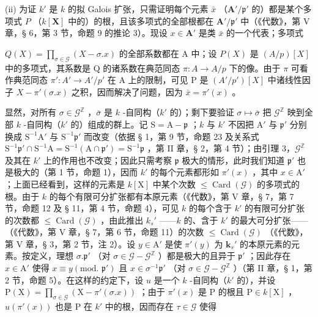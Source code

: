 (ii) 为证 \(k'\) 是 \(k\) 的拟 Galois 扩张，只需证明每个元素 \(\bar{x}\) （\(\mathbf{A}'/\mathfrak{p}'\) 的）都是某个多项式 \(P\) （\(k[\mathbf{X}]\) 中的）的根，且该多项式的全部根都在 \(\mathbf{A}'/\mathfrak{p}'\) 中（《代数》，第 V 章，§ 6，第 3 节，命题 9 的推论 3）。现设 \(x \in \mathbf{A}'\) 是类 \(\bar{x}\) 的一个代表；多项式

\(Q(X) = \prod_{\sigma \in \mathcal{G}} (X - \sigma.x)\) 的全部系数都在 A 中；设 \(P(X)\) 是 \((A/p)[X]\) 中的多项式，其系数是 Q 的诸系数在典范同态 \(\pi: A \to A/p\) 下的像。由于 \(\pi\) 可看作典范同态 \(\pi': A' \to A'/p'\) 在 A 上的限制，可见 P 是 \((A'/p')[X]\) 中诸线性因子 \(X - \pi'(\sigma.x)\) 之积，因而解决了问题，因为 \(\bar{x} = \pi'(x)\) 。

显然，对所有 \(\sigma \in \mathcal{G}^{\mathbb{Z}}\) ，\(\bar{\sigma}\) 是 \(k\) -自同构（\(k'\) 的）；剩下要验证 \(\sigma \mapsto \bar{\sigma}\) 把 \(\mathcal{G}^{\mathbb{Z}}\) 映到全部 \(k\) -自同构（\(k'\) 的）组成的群上。记 \(\mathrm{S} = \mathrm{A} - \mathfrak{p}\) ；\(k\) 与 \(k'\) 不因把 \(\mathrm{A}'\) 与 \(\mathfrak{p}'\) 分别换成 \(\mathrm{S}^{-1}\mathrm{A}'\) 与 \(\mathrm{S}^{-1}\mathfrak{p}'\) 而改变（依据 § 1，第 9 节，命题 23 及关系式 \(\mathrm{S}^{-1}\mathfrak{p}' \cap \mathrm{S}^{-1}\mathrm{A} = \mathrm{S}^{-1}(\mathrm{A} \cap \mathfrak{p}') = \mathrm{S}^{-1}\mathfrak{p}\) ，第 II 章，§ 2，第 4 节）；由引理 3，\(\mathcal{G}^{\mathbb{Z}}\) 及其在 \(k'\) 上的作用也不改变；因此只需考察 \(\mathfrak{p}\) 极大的情形，此时我们知道 \(\mathfrak{p}'\) 也是极大的（第 1 节，命题 1），因而 \(k'\) 的每个元素都形如 \(\pi'(x)\) ，其中 \(x \in \mathrm{A}'\) ；上面已经看到，这样的元素是 \(k[\mathrm{X}]\) 中某个次数 \(\leqslant \operatorname{Card}(\mathcal{G})\) 的多项式的根。由于 \(k\) 的每个有限可分扩张都有本原元素（《代数》，第 V 章，§ 7，第 7 节，命题 12 及 § 11，第 4 节，命题 4），可见 \(k\) 的每个含于 \(k'\) 的有限可分扩张的次数都 \(\leqslant \operatorname{Card}(\mathcal{G})\) ，由此推出 \(k_s'\) ——\(k\) 的、含于 \(k'\) 的最大可分扩张——（《代数》，第 V 章，§ 7，第 6 节，命题 11）的次数 \(\leqslant \operatorname{Card}(\mathcal{G})\) （《代数》，第 V 章，§ 3，第 2 节，注 2）。设 \(y \in \mathrm{A}'\) 是使 \(\pi'(y)\) 为 \(\mathbf{k}_s'\) 的本原元素的元素。按定义，理想 \(\sigma .\mathfrak{p}'\) （对 \(\sigma \in \mathcal{G} - \mathcal{G}^{\mathbb{Z}}\) ）都是极大的且异于 \(\mathfrak{p}'\) ；因此存在 \(x \in \mathrm{A}'\) 使得 \(x \equiv y (\text{mod. } \mathfrak{p}')\) 且 \(x \in \sigma^{-1}\mathfrak{p}'\) （对 \(\sigma \in \mathcal{G} - \mathcal{G}^{\mathbb{Z}}\) ）（第 II 章，§ 1，第 2 节，命题 5）。在这样的约定下，设 \(u\) 是一个 \(k\) -自同构（\(k'\) 的），并设 \(\mathrm{P}(\mathrm{X}) = \prod_{\sigma \in \mathcal{G}} (\mathrm{X} - \pi'(\sigma .x))\) ；由于 \(\pi'(x)\) 是 P 的根且 \(\mathrm{P} \in k[\mathrm{X}]\) ，\(u(\pi'(x))\) 也是 P 在 \(k'\) 中的根，因而存在 \(\tau \in \mathcal{G}\) 使得

